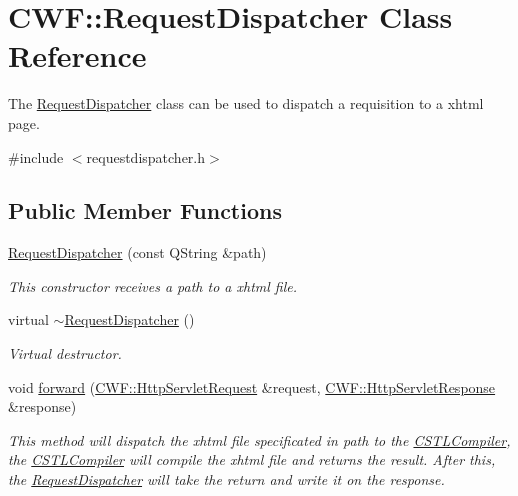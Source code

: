 \hypertarget{class_c_w_f_1_1_request_dispatcher}{\section{C\+W\+F\+:\+:Request\+Dispatcher Class Reference}
\label{class_c_w_f_1_1_request_dispatcher}
}


The \hyperlink{class_c_w_f_1_1_request_dispatcher}{Request\+Dispatcher} class can be used to dispatch a requisition to a xhtml page.  




{\ttfamily \#include $<$requestdispatcher.\+h$>$}

\subsection*{Public Member Functions}
\begin{DoxyCompactItemize}
\item 
\hyperlink{class_c_w_f_1_1_request_dispatcher_a165259f215b920a52573dbc37c3985f2}{Request\+Dispatcher} (const Q\+String \&path)
\begin{DoxyCompactList}\small\item\em This constructor receives a path to a xhtml file. \end{DoxyCompactList}\item 
virtual \hyperlink{class_c_w_f_1_1_request_dispatcher_a668e801a8b718373e9e886c613ed54ad}{$\sim$\+Request\+Dispatcher} ()
\begin{DoxyCompactList}\small\item\em Virtual destructor. \end{DoxyCompactList}\item 
void \hyperlink{class_c_w_f_1_1_request_dispatcher_a075c11ff233f217196764899f9edf7d0}{forward} (\hyperlink{class_c_w_f_1_1_http_servlet_request}{C\+W\+F\+::\+Http\+Servlet\+Request} \&request, \hyperlink{class_c_w_f_1_1_http_servlet_response}{C\+W\+F\+::\+Http\+Servlet\+Response} \&response)
\begin{DoxyCompactList}\small\item\em This method will dispatch the xhtml file specificated in path to the \hyperlink{class_c_w_f_1_1_c_s_t_l_compiler}{C\+S\+T\+L\+Compiler}, the \hyperlink{class_c_w_f_1_1_c_s_t_l_compiler}{C\+S\+T\+L\+Compiler} will compile the xhtml file and returns the result. After this, the \hyperlink{class_c_w_f_1_1_request_dispatcher}{Request\+Dispatcher} will take the return and write it on the response. \end{DoxyCompactList}\end{DoxyCompactItemize}


